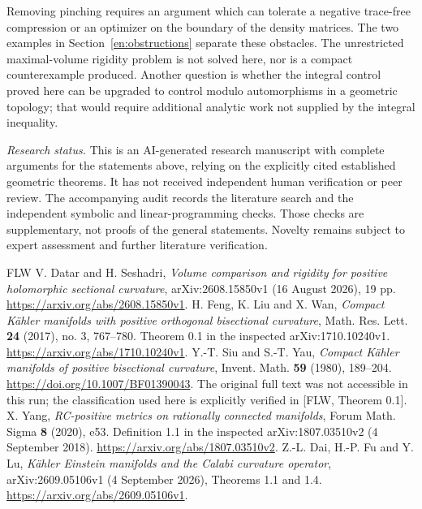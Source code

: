 \documentclass[12pt]{amsart}
\theoremstyle{definition}
\theoremstyle{remark}
\numberwithin{equation}{section}
\theoremstyle{plain}
\theoremstyle{remark}
\theoremstyle{definition}
\begin{document}
Removing pinching requires an argument which can tolerate a negative
trace-free compression or an optimizer on the boundary of the density
matrices. The two examples in Section~\ref{en:obstructions} separate
these obstacles. The unrestricted maximal-volume rigidity problem is
not solved here, nor is a compact counterexample produced. Another
question is whether the integral control proved here can be upgraded
to control modulo automorphisms in a geometric topology; that would
require additional analytic work not supplied by the integral inequality.

\medskip
\noindent\textit{Research status.} This is an AI-generated research
manuscript with complete arguments for the statements above, relying
on the explicitly cited established geometric theorems. It has not
received independent human verification or peer review. The accompanying
audit records the literature search and the independent symbolic and
linear-programming checks. Those checks are supplementary, not proofs
of the general statements. Novelty remains subject to expert assessment
and further literature verification.

\begin{thebibliography}{FLW}
V. Datar and H. Seshadri,
\textit{Volume comparison and rigidity for positive holomorphic sectional curvature},
arXiv:2608.15850v1 (16 August 2026), 19 pp.
\url{https://arxiv.org/abs/2608.15850v1}.
H. Feng, K. Liu and X. Wan,
\textit{Compact K\"ahler manifolds with positive orthogonal bisectional curvature},
Math. Res. Lett. \textbf{24} (2017), no. 3, 767--780.
Theorem 0.1 in the inspected arXiv:1710.10240v1.
\url{https://arxiv.org/abs/1710.10240v1}.
Y.-T. Siu and S.-T. Yau,
\textit{Compact K\"ahler manifolds of positive bisectional curvature},
Invent. Math. \textbf{59} (1980), 189--204.
\url{https://doi.org/10.1007/BF01390043}.
The original full text was not accessible in this run; the classification
used here is explicitly verified in [FLW, Theorem 0.1].
X. Yang,
\textit{RC-positive metrics on rationally connected manifolds},
Forum Math. Sigma \textbf{8} (2020), e53.
Definition 1.1 in the inspected arXiv:1807.03510v2 (4 September 2018).
\url{https://arxiv.org/abs/1807.03510v2}.
Z.-L. Dai, H.-P. Fu and Y. Lu,
\textit{K\"ahler Einstein manifolds and the Calabi curvature operator},
arXiv:2609.05106v1 (4 September 2026), Theorems 1.1 and 1.4.
\url{https://arxiv.org/abs/2609.05106v1}.
\end{thebibliography}
\end{document}
